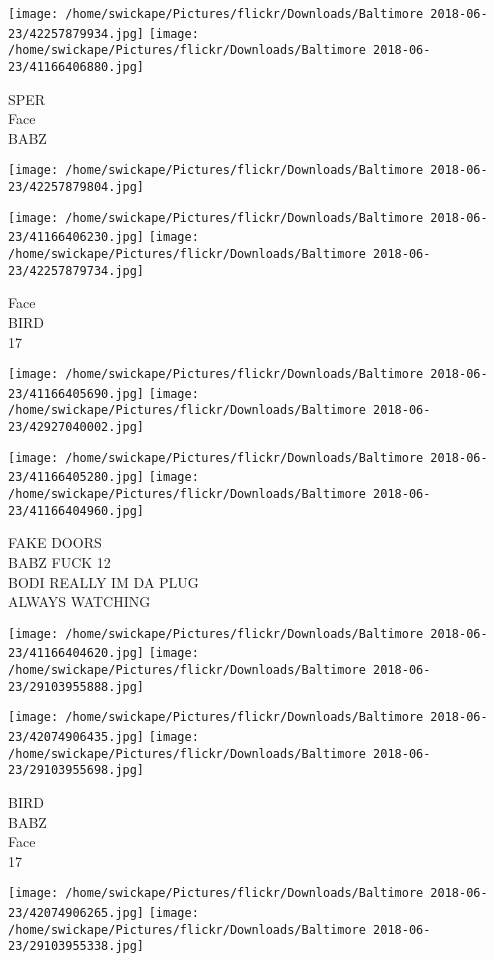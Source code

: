 \documentclass[10pt,letterpaper]{article}
\begin{document}
\vspace{0.25in}
\texttt{[image: /home/swickape/Pictures/flickr/Downloads/Baltimore 2018-06-23/42257879934.jpg]}
\texttt{[image: /home/swickape/Pictures/flickr/Downloads/Baltimore 2018-06-23/41166406880.jpg]}

SPER\\
Face\\
BABZ
\pagebreak

\texttt{[image: /home/swickape/Pictures/flickr/Downloads/Baltimore 2018-06-23/42257879804.jpg]}

\vspace{0.25in}
\texttt{[image: /home/swickape/Pictures/flickr/Downloads/Baltimore 2018-06-23/41166406230.jpg]}
\texttt{[image: /home/swickape/Pictures/flickr/Downloads/Baltimore 2018-06-23/42257879734.jpg]}

Face\\
BIRD\\
17
\pagebreak

\texttt{[image: /home/swickape/Pictures/flickr/Downloads/Baltimore 2018-06-23/41166405690.jpg]}
\texttt{[image: /home/swickape/Pictures/flickr/Downloads/Baltimore 2018-06-23/42927040002.jpg]}

\texttt{[image: /home/swickape/Pictures/flickr/Downloads/Baltimore 2018-06-23/41166405280.jpg]}
\texttt{[image: /home/swickape/Pictures/flickr/Downloads/Baltimore 2018-06-23/41166404960.jpg]}

FAKE DOORS\\
BABZ FUCK 12\\
BODI REALLY IM DA PLUG\\
ALWAYS WATCHING
\pagebreak

\texttt{[image: /home/swickape/Pictures/flickr/Downloads/Baltimore 2018-06-23/41166404620.jpg]}
\texttt{[image: /home/swickape/Pictures/flickr/Downloads/Baltimore 2018-06-23/29103955888.jpg]}

\texttt{[image: /home/swickape/Pictures/flickr/Downloads/Baltimore 2018-06-23/42074906435.jpg]}
\texttt{[image: /home/swickape/Pictures/flickr/Downloads/Baltimore 2018-06-23/29103955698.jpg]}

BIRD\\
BABZ\\
Face\\
17
\pagebreak

\texttt{[image: /home/swickape/Pictures/flickr/Downloads/Baltimore 2018-06-23/42074906265.jpg]}
\texttt{[image: /home/swickape/Pictures/flickr/Downloads/Baltimore 2018-06-23/29103955338.jpg]}
\end{document}
